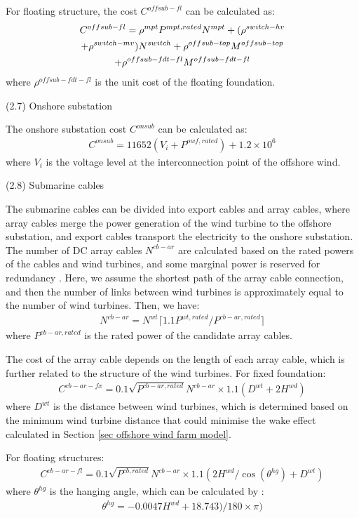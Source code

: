 \documentclass[sn-mathphys,Numbered]{sn-jnl}%
\theoremstyle{thmstyleone}%
\theoremstyle{thmstyletwo}%
\theoremstyle{thmstylethree}%
\begin{document}
For floating structure, the cost $C^{offsub-fl}$ can be calculated as:
\begin{gather}
    C^{offsub-fl} = \rho^{mpt} P^{mpt,rated} N^{mpt} + (\rho^{switch-hv} 
\notag\\
    + \rho^{switch-mv}) N^{switch} + \rho^{offsub-top} M^{offsub-top} 
\notag\\
    + \rho^{offsub-fdt-fl} M^{offsub-fdt-fl}
\end{gather}
where $\rho^{offsub-fdt-fl}$ is the unit cost of the floating foundation.

(2.7) Onshore substation

The onshore substation cost $C^{onsub}$ can be calculated as:
\begin{gather}
    C^{onsub} = 11652(V_i+P^{owf,rated}) + 1.2 \times 10^6
\end{gather}
where $V_i$ is the voltage level at the interconnection point of the offshore wind.

(2.8) Submarine cables

The submarine cables can be divided into export cables and array cables, where array cables merge the power generation of the wind turbine to the offshore substation, and export cables transport the electricity to the onshore substation.
The number of DC array cables $N^{cb-ar}$ are calculated based on the rated powers of the cables and wind turbines, and some marginal power is reserved for redundancy \cite{guo2023grid}. Here, we assume the shortest path of the array cable connection, and then the number of links between wind turbines is approximately equal to the number of wind turbines. Then, we have:
\begin{gather}
    N^{cb-ar} = N^{wt} \lceil 1.1 P^{wt,rated} / P^{cb-ar,rated} \rceil
\end{gather}
where $P^{cb-ar,rated}$ is the rated power of the candidate array cables.

The cost of the array cable depends on the length of each array cable, which is further related to the structure of the wind turbines. For fixed foundation:
\begin{gather}
    C^{cb-ar-fx} = 0.1 \sqrt{P^{cb-ar,rated}} N^{cb-ar} \times 1.1 (D^{wt}+2H^{wd}) 
\end{gather}
where $D^{wt}$ is the distance between wind turbines, which is determined based on the minimum wind turbine distance that could minimise the wake effect calculated in Section \ref{sec offshore wind farm model}.

For floating structures:
\begin{gather}
    C^{cb-ar-fl} = 0.1 \sqrt{P^{cb,rated}} N^{cb-ar} \times 1.1 (2H^{wd}/\cos{(\theta^{hg})} + D^{wt})
\end{gather}
where $\theta^{hg}$ is the hanging angle, which can be calculated by \cite{NRELOffshoreBalance}:
\begin{gather}
    \theta^{hg} = -0.0047H^{wd}+18.743)/180\times \pi)
\end{gather}
\end{document}
